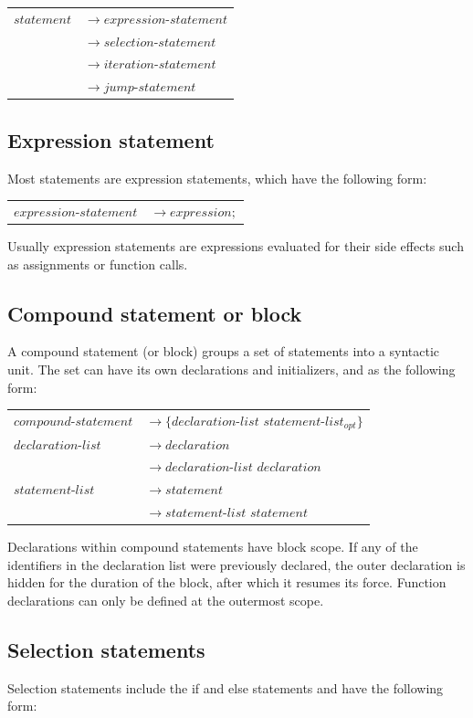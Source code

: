 \documentclass[12pt,A4]{book}
\begin{document}
\begin{tabular}{l l}
$statement$ & $\rightarrow expression\mbox{-}statement$\\
& $\rightarrow selection\mbox{-}statement$\\
& $\rightarrow iteration\mbox{-}statement$\\
& $\rightarrow jump\mbox{-}statement$\\
\end{tabular}

\subsection{Expression statement}
Most statements are expression statements, which have the following form:

\begin{tabular}{l l}
$expression\mbox{-}statement$ & $\rightarrow expression;$
\end{tabular}

Usually expression statements are expressions evaluated for their side effects such as assignments or function calls.
\subsection{Compound statement or block}
A compound statement (or block) groups a set of statements into a syntactic unit.  The set can have its own declarations and initializers, and as the following form:

\begin{tabular}{l l}
$compound\mbox{-}statement$  & $\rightarrow \{declaration\mbox{-}list$ $statement\mbox{-}list_{opt}\}$\\
$declaration\mbox{-}list$ & $\rightarrow declaration$\\
& $\rightarrow declaration\mbox{-}list$ $declaration$\\
$statement\mbox{-}list$  & $\rightarrow statement$\\
& $\rightarrow statement\mbox{-}list$ $statement$\\
\end{tabular}

Declarations within compound statements have block scope.  If any of the identifiers in the declaration list were previously declared, the outer declaration is hidden for the duration of the block, after which it resumes its force.  Function declarations can only be defined at the outermost scope.
\subsection{Selection statements}
Selection statements include the if and else statements and have the following form:
\end{document}
